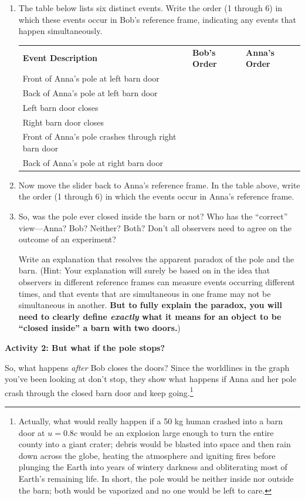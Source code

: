 \begin{enumerate}
\item The table below lists six distinct events.  Write the order (1 through 6) in which these events occur in Bob's reference frame, indicating any events that happen simultaneously.  

\begin{center}
{\renewcommand{\arraystretch}{1.8}
\begin{tabular}{|l|C{1.0in}|C{1.0in}|} \hline 
\textbf{Event Description} & \textbf{Bob's Order} & \textbf{Anna's Order} \\ 
\hhline{|=|=|=|}
Front of Anna's pole at left barn door & & \\ \hline 
Back of Anna's pole at left barn door & & \\ \hline 
Left barn door closes & & \\ \hline 
Right barn door closes & & \\ \hline 
Front of Anna's pole crashes through right barn door & & \\ \hline 
Back of Anna's pole at right barn door & & \\ \hline 
\end{tabular} }
\end{center}

\item Now move the slider back to Anna's reference frame. In the table above, write the order (1 through 6) in which the events occur in Anna's reference frame.  

\item So, was the pole ever closed inside the barn or not? Who has the ``correct'' view---Anna? Bob? Neither? Both?  Don't all observers need to agree on the outcome of an experiment?  
\medskip

Write an explanation that resolves the apparent paradox of the pole and the barn. 
(Hint: Your explanation will surely be based on in the idea that observers in different reference frames can measure events occurring different times, and that events that are simultaneous in one frame may not be simultaneous in another.  
\textbf{But to fully explain the paradox, you will need to clearly define \textit{exactly} what it means for an object to be ``closed inside'' a barn with two doors.})
\answerspace{1.5in}

\end{enumerate}

\textbf{Activity 2: But what if the pole stops?}

So, what happens \textit{after} Bob closes the doors?  Since the worldlines in the graph you've been looking at don't stop, they show what happens if Anna and her pole crash through the closed barn door and keep going.\footnote{Actually, what would really happen if a 50 kg human crashed into a barn door at $u=0.8c$ would be an explosion large enough to turn the entire county into a giant crater; debris would be blasted into space and then rain down across the globe, heating the atmosphere and igniting fires before plunging the Earth into years of wintery darkness and obliterating most of Earth's remaining life.  In short, the pole would be neither inside nor outside the barn; both would be vaporized and no one would be left to care.}

